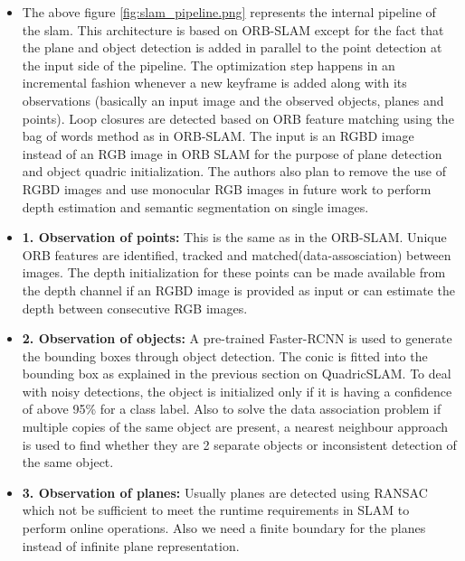 \documentclass{article}
\begin{document}
\begin{itemize}
\item The above figure \ref{fig:slam_pipeline.png} represents the internal pipeline of the slam. This architecture is based on ORB-SLAM except for the fact that the plane and object detection is added in parallel to the point detection at the input side of the pipeline. The optimization step happens in an incremental fashion whenever a new keyframe is added along with its observations (basically an input image and the observed objects, planes and points). Loop closures are detected based on ORB feature matching using the bag of words method as in ORB-SLAM. The input is an RGBD image instead of an RGB image in ORB SLAM for the purpose of plane detection and object quadric initialization. The authors also plan to remove the use of RGBD images and use monocular RGB images in future work to perform depth estimation and semantic segmentation on single images.
\item \textbf{1. Observation of points: } This is the same as in the ORB-SLAM. Unique ORB features are identified, tracked and matched(data-assosciation) between images. The depth initialization for these points can be made available from the depth channel if an RGBD image is provided as input or can estimate the depth between consecutive RGB images.
\item \textbf{2. Observation of objects: } A pre-trained Faster-RCNN is used to generate the bounding boxes through object detection. The conic is fitted into the bounding box as explained in the previous section on QuadricSLAM. To deal with noisy detections, the object is initialized only if it is having a confidence of above 95\% for a class label. Also to solve the data association problem if multiple copies of the same object are present, a nearest neighbour approach is used to find whether they are 2 separate objects or inconsistent detection of the same object.
\item \textbf{3. Observation of planes: } Usually planes are detected using RANSAC which not be sufficient to meet the runtime requirements in SLAM to perform online operations. Also we need a finite boundary for the planes instead of infinite plane representation.

\end{itemize}
\end{document}
